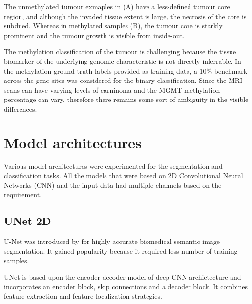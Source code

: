 The unmethylated tumour exmaples in (A) have a less-defined tumour core region, and although the invaded tissue extent is large, the necrosis of the core is subdued. Whereas in methylated samples (B), the tumour core is starkly prominent and the tumour growth is visible from inside-out.
\vspace*{2mm}

The methylation classification of the tumour is challenging because the tissue biomarker of the underlying genomic characteristic is not directly inferrable. In the methylation ground-truth labels provided as training data, a 10\% benchmark across the gene sites was considered for the binary classification. Since the MRI scans can have varying levels of carninoma and the MGMT methylation percentage can vary, therefore there remains some sort of ambiguity in the visible differences. 

\section{Model architectures}

Various model architectures were experimented for the segmentation and classification tasks. All the models that were based on 2D Convolutional Neural Networks (CNN) and the input data had multiple channels based on the requirement.

\subsection{UNet 2D }
\vspace*{2mm}
U-Net was introduced by \cite{Unet} for highly accurate biomedical semantic image segmentation. It gained popularity because it required less number of training samples. 
\vspace*{2mm}

UNet is based upon the encoder-decoder model of deep CNN archictecture and incorporates an encoder block, skip connections and a decoder block. It combines feature extraction and feature localization strategies. 

